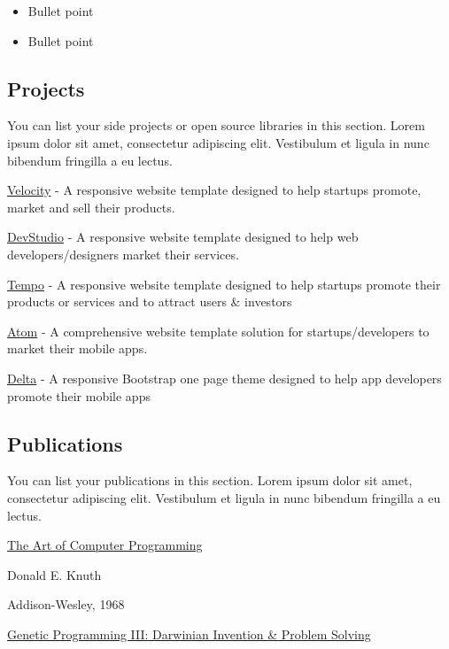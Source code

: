 \documentclass[english,]{article}
\providecommand{\tightlist}{%
  \setlength{\itemsep}{0pt}\setlength{\parskip}{0pt}}
\begin{document}
\begin{itemize}
\tightlist
\item
  Bullet point
\item
  Bullet point
\end{itemize}

\hypertarget{projects}{%
\subsection{\texorpdfstring{{ \emph{} \emph{} }
Projects}{    Projects}}\label{projects}}

You can list your side projects or open source libraries in this
section. Lorem ipsum dolor sit amet, consectetur adipiscing elit.
Vestibulum et ligula in nunc bibendum fringilla a eu lectus.

{ \protect\hyperlink{hook}{Velocity} } - {A responsive website template
designed to help startups promote, market and sell their products.}

{ \protect\hyperlink{}{DevStudio} } - {A responsive website template
designed to help web developers/designers market their services.}

{ \protect\hyperlink{}{Tempo} } - {A responsive website template
designed to help startups promote their products or services and to
attract users \& investors}

{ \protect\hyperlink{}{Atom} } - {A comprehensive website template
solution for startups/developers to market their mobile apps.}

{ \protect\hyperlink{}{Delta} } - {A responsive Bootstrap one page theme
designed to help app developers promote their mobile apps}

\hypertarget{publications}{%
\subsection{\texorpdfstring{{ \emph{} \emph{} }
Publications}{    Publications}}\label{publications}}

You can list your publications in this section. Lorem ipsum dolor sit
amet, consectetur adipiscing elit. Vestibulum et ligula in nunc bibendum
fringilla a eu lectus.

\protect\hyperlink{}{The Art of Computer Programming}

Donald E. Knuth

Addison-Wesley, 1968

\protect\hyperlink{}{Genetic Programming III: Darwinian Invention \&
Problem Solving}
\end{document}
